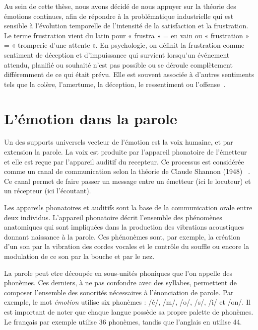 Au sein de cette thèse, nous avons décidé de nous appuyer sur la théorie des émotions continues, afin de répondre à la problématique industrielle qui est sensible à l'évolution temporelle de l'intensité de la satisfaction et la frustration.
Le terme frustration vient du latin pour « frustra » = en vain ou « frustration » = « tromperie d’une attente ». En psychologie, on définit la frustration comme sentiment de déception et d’impuissance qui survient lorsqu’un événement attendu, planifié ou souhaité n’est pas possible ou se déroule complètement différemment de ce qui était prévu. Elle est souvent associée à d'autres sentiments tels que la colère, l'amertume, la déception, le ressentiment ou l'offense~\cite{Maslow2013}.

\section{L'émotion dans la parole}
Un des supports universels vecteur de l'émotion est la voix humaine, et par extension la parole.
La voix est produite par l'appareil phonatoire de l'émetteur et elle est reçue par l'appareil auditif du recepteur. Ce processus est considérée comme un canal de communication selon la théorie de Claude Shannon (1948) ~\cite{Shannon1948}. Ce canal permet de faire passer un message entre un émetteur (ici le locuteur) et un récepteur (ici l'écoutant).

Les appareils phonatoires et auditifs sont la base de la communication orale entre deux individus. L'appareil phonatoire décrit l'ensemble des phénomènes anatomiques qui sont impliquées dans la production des vibrations acoustiques donnant naissance à la parole. Ces phénonèmes sont, par exemple, la création d'un son par la vibration des cordes vocales et le contrôle du souffle ou encore la modulation de ce son par la bouche et par le nez.

La parole peut etre découpée en sous-unités phoniques que l'on appelle des phonèmes. Ces derniers, à ne pas confondre avec des syllabes, permettent de composer l'ensemble des sonorités nécessaires à l'énonciation de parole.
Par exemple, le mot \textit{émotion} utilise six phonèmes : /é/, /m/, /o/, /s/, /i/ et /on/.
Il est important de noter que chaque langue possède sa propre palette de phonèmes. Le français par exemple utilise 36 phonèmes, tandis que l'anglais en utilise 44.

